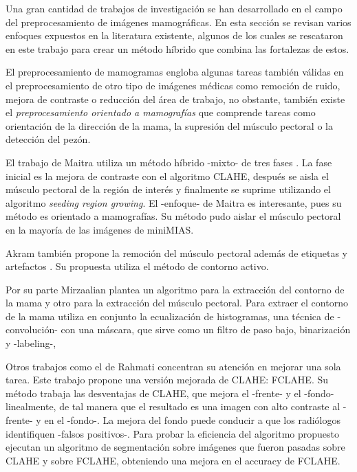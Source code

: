 Una gran cantidad de trabajos de investigación se han desarrollado en el
campo del preprocesamiento de imágenes mamográficas. En esta sección se revisan
varios enfoques expuestos en la literatura existente, algunos de los cuales se
rescataron en este trabajo para crear un método híbrido que combina las
fortalezas de estos. 

El preprocesamiento de mamogramas engloba algunas tareas también válidas en
el preprocesamiento de otro tipo de imágenes médicas como remoción de ruido,
mejora de contraste o reducción del área de trabajo, no obstante, también
existe el \textit{preprocesamiento orientado a mamografías} que comprende
tareas como orientación de la dirección de la mama, la supresión del músculo
pectoral o la detección del pezón.


El trabajo de Maitra utiliza un método híbrido -mixto- de tres fases
\cite{maitra2012technique}. La fase inicial es la mejora de contraste con el
algoritmo CLAHE, después se aisla el músculo pectoral de la región de interés y
finalmente se suprime utilizando el algoritmo \textit{seeding region growing}.
El -enfoque- de Maitra es interesante, pues su método es orientado a
mamografías. Su método pudo aislar el músculo pectoral en la mayoría de las
imágenes de miniMIAS.

Akram también propone la remoción del músculo pectoral además de etiquetas y
artefactos \cite{akram2013preprocessing}. Su propuesta utiliza el método de
contorno activo. 

Por su parte Mirzaalian \cite{mirzaalian2007pre} plantea un algoritmo para la
extracción del contorno de la mama y otro para la extracción del músculo
pectoral. Para extraer el contorno de la mama utiliza en conjunto la
ecualización de histogramas, una técnica de -convolución- con una máscara, que
sirve como un filtro de paso bajo, binarización y -labeling-, 

Otros trabajos como el de Rahmati \cite{rahmati2010new} concentran su atención en
mejorar una sola tarea. Este trabajo propone una versión mejorada de CLAHE:
FCLAHE. Su método trabaja las desventajas de CLAHE, que mejora el -frente- y el
-fondo- linealmente, de tal manera que el resultado es una imagen con alto
contraste al -frente- y en el -fondo-. La mejora del fondo puede conducir a que
los radiólogos identifiquen -falsos positivos-. Para probar la eficiencia del
algoritmo propuesto ejecutan un algoritmo de segmentación sobre imágenes que
fueron pasadas sobre CLAHE y sobre FCLAHE, obteniendo una mejora en el accuracy
de FCLAHE.

